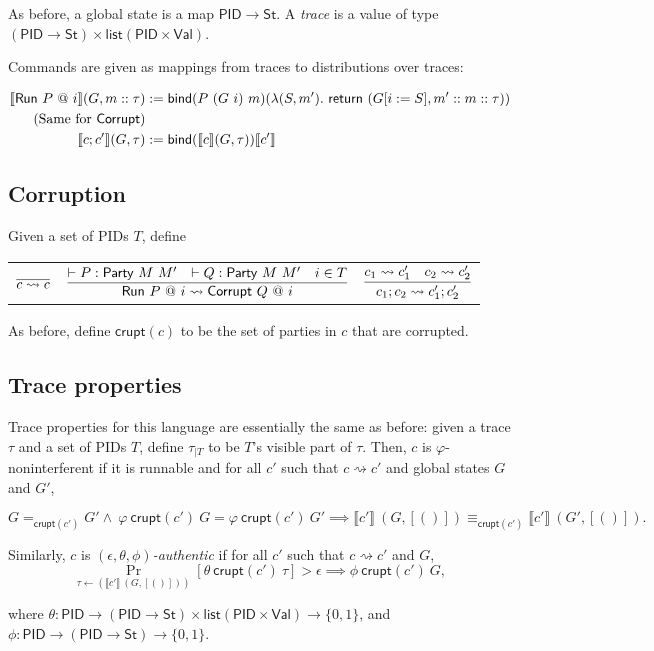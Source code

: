 \documentclass{article}
\newcommand{\Val}{\mathsf{Val}}
\newcommand{\St}{\mathsf{St}}
\newcommand{\PID}{\mathsf{PID}}
\renewcommand{\list}{\mathsf{list}}
\begin{document}
As before, a global state is a map $\PID \to \St$. A \emph{trace} is a value of type $(\PID \to \St) \times \list (\PID \times \Val)$.

Commands are given as mappings from traces to distributions over traces:

\begin{align*}
    \llbracket \textsf{Run}\ P\ @\ i \rrbracket (G, m :: \tau) &:= \mathsf{bind} (P\ (G\ i)\ m) (\lambda (S, m').\ \mathsf{return}\ (G[i := S], m' :: m :: \tau)) \\
    \text{(Same for \textsf{Corrupt})} \\
    \llbracket c; c' \rrbracket (G, \tau) &:= \mathsf{bind} (\llbracket c \rrbracket (G, \tau)) \llbracket c' \rrbracket
\end{align*}

\subsection{Corruption}

Given a set of PIDs $T$, define

\begin{tabular}{ccc}
    $\infer{c \rightsquigarrow c}{}$ &
    $\infer{\textsf{Run}\ P\ @\ i \rightsquigarrow \textsf{Corrupt}\ Q\ @\ i}{\vdash P : \textsf{Party}\ M\ M' & \vdash Q : \textsf{Party}\ M\ M' & i \in T}$ &
    $\infer{c_1; c_2 \rightsquigarrow c'_1; c'_2}{c_1 \rightsquigarrow c'_1 & c_2 \rightsquigarrow c'_2}$
\end{tabular}


As before, define $\mathsf{crupt}(c)$ to be the set of parties in $c$ that are corrupted.

\subsection{Trace properties}

Trace properties for this language are essentially the same as before: given a trace $\tau$ and a set of PIDs $T$, define $\tau_{| T}$ to be $T$'s visible part of $\tau$. Then, $c$ is $\varphi$-noninterferent if it is runnable and for all $c'$ such that $c \rightsquigarrow c'$ and global states $G$ and $G'$,

\[ G=_{\mathsf{crupt}(c')}G' \wedge\ \varphi\ \mathsf{crupt}(c')\ G = \varphi\ \mathsf{crupt}(c')\ G' \implies \llbracket c' \rrbracket\ (G, [()]) \equiv_{\mathsf{crupt}(c')} \llbracket c' \rrbracket\ (G', [()]).\]

Similarly, $c$ is \emph{$(\epsilon, \theta, \phi)$-authentic} if for all $c'$ such that $c \rightsquigarrow c'$ and $G$,
\[ \Pr_{\tau \leftarrow (\llbracket c' \rrbracket\ (G, [()]))}[\theta\ \mathsf{crupt}(c')\ \tau] > \epsilon \implies \phi\ \mathsf{crupt}(c')\ G,\]

where $\theta : \PID \to (\PID \to \St) \times \list (\PID \times \Val) \to \{0,1\}$, and $\phi : \PID \to (\PID \to \St) \to \{0,1\}$.
\end{document}
